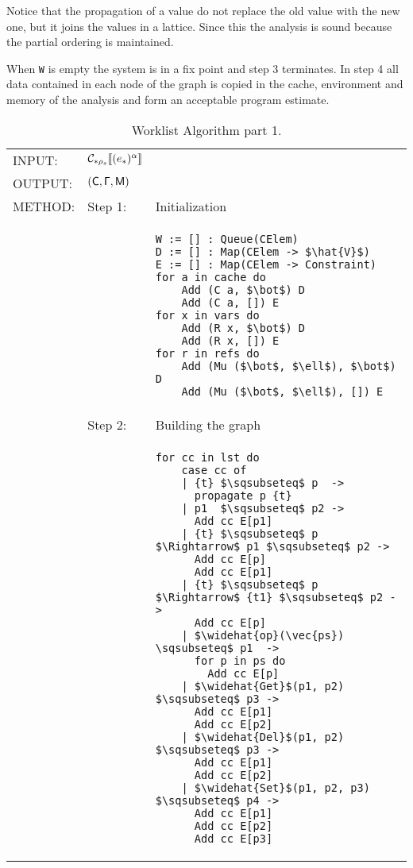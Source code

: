 Notice that the propagation of a value do not replace the old value with the new one, but it joins the values in a lattice. Since this the analysis is sound because the partial ordering is maintained.

When \texttt{W} is empty the system is in a fix point and step 3 terminates. In step 4 all data contained in each node of the graph is copied in the cache, environment and memory of the analysis and form an acceptable program estimate.

\begin{table}[htb]
\small
\begin{center}
\begin{tabular}{l l l}
INPUT: & $\mathcal{C}_{*\rho_s}\llbracket (e_*)^\alpha \rrbracket$\\
OUTPUT: & $(\mathsf{C}, \mathsf{\Gamma}, \mathsf{M})$\\
METHOD: &
Step 1:& Initialization\\
&&
\begin{lstlisting}[mathescape]
W := [] : Queue(CElem)
D := [] : Map(CElem -> $\hat{V}$)
E := [] : Map(CElem -> Constraint)
for a in cache do 
    Add (C a, $\bot$) D
    Add (C a, []) E
for x in vars do 
    Add (R x, $\bot$) D
    Add (R x, []) E
for r in refs do 
    Add (Mu ($\bot$, $\ell$), $\bot$) D
    Add (Mu ($\bot$, $\ell$), []) E
\end{lstlisting}\\
&Step 2: & Building the graph\\
&&
\begin{lstlisting}[mathescape]
for cc in lst do
    case cc of
    | {t} $\sqsubseteq$ p  -> 
      propagate p {t}
    | p1  $\sqsubseteq$ p2 -> 
      Add cc E[p1]
    | {t} $\sqsubseteq$ p $\Rightarrow$ p1 $\sqsubseteq$ p2 -> 
      Add cc E[p]
      Add cc E[p1]
    | {t} $\sqsubseteq$ p $\Rightarrow$ {t1} $\sqsubseteq$ p2 -> 
      Add cc E[p]
    | $\widehat{op}(\vec{ps}) \sqsubseteq$ p1  -> 
      for p in ps do
        Add cc E[p]
    | $\widehat{Get}$(p1, p2) $\sqsubseteq$ p3 -> 
      Add cc E[p1]
      Add cc E[p2]
    | $\widehat{Del}$(p1, p2) $\sqsubseteq$ p3 -> 
      Add cc E[p1]
      Add cc E[p2]
    | $\widehat{Set}$(p1, p2, p3) $\sqsubseteq$ p4 -> 
      Add cc E[p1]
      Add cc E[p2]
      Add cc E[p3]
\end{lstlisting}\\
\end{tabular}
\end{center}
\caption{Worklist Algorithm part 1.}
\label{tab:Worklist1}
\end{table}
